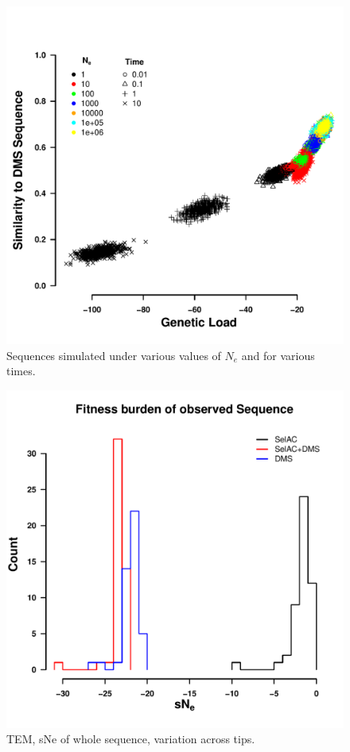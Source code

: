\documentclass[12pt]{article}
\begin{document}
\begin{figure}[H]
     \centering
	\includegraphics[width=\textwidth]{img/simulated_seqs_gl_dist.pdf}
	\caption{Sequences simulated under various values of $N_e$ and for various times. }
	\label{fig:sim_seqs}
\end{figure}

\begin{figure}[H]
     \centering
	\includegraphics[width=\textwidth]{img/sNe_TEM2016}
	\caption{TEM, sNe of whole sequence, variation across tips.}
	\label{fig:sne_tem2016}
\end{figure}
\end{document}
